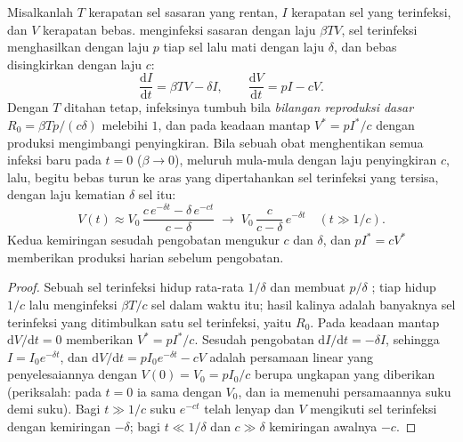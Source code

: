 \begin{theorem}\label{thm:b3:virology:dynamics}
%
Misalkanlah $T$ kerapatan sel sasaran yang rentan, $I$ kerapatan sel yang
terinfeksi, dan $V$ kerapatan  bebas.  menginfeksi sasaran dengan
laju $\beta TV$, sel terinfeksi menghasilkan  dengan laju $p$ tiap sel
lalu mati dengan laju $\delta$, dan  bebas disingkirkan dengan laju $c$:
\[
\frac{\mathrm{d}I}{\mathrm{d}t} = \beta TV - \delta I, \qquad
\frac{\mathrm{d}V}{\mathrm{d}t} = pI - cV .
\]
Dengan $T$ ditahan tetap, infeksinya tumbuh bila \emph{bilangan reproduksi
dasar} $R_{0} = \beta Tp/(c\delta)$ melebihi $1$, dan pada keadaan mantap
$V^{*} = p I^{*}/c$ dengan produksi mengimbangi penyingkiran.
Bila sebuah obat menghentikan semua infeksi baru pada $t = 0$ ($\beta \to 0$),
 meluruh mula-mula dengan laju penyingkiran $c$, lalu, begitu  bebas
turun ke aras yang dipertahankan sel terinfeksi yang tersisa, dengan laju
kematian $\delta$ sel itu:
\[
V(t) \approx V_{0}\,\frac{c\,e^{-\delta t} - \delta\,e^{-ct}}{c - \delta}
\;\longrightarrow\; V_{0}\,\frac{c}{c-\delta}\,e^{-\delta t}
\quad (t \gg 1/c).
\]
Kedua kemiringan  sesudah pengobatan mengukur $c$ dan
$\delta$, dan $pI^{*} = cV^{*}$ memberikan produksi  harian
sebelum pengobatan.
\end{theorem}
\begin{proof}
Sebuah sel terinfeksi hidup rata-rata $1/\delta$ dan membuat $p/\delta$
; tiap  hidup $1/c$ lalu menginfeksi $\beta T/c$ sel dalam waktu
itu; hasil kalinya adalah banyaknya sel terinfeksi yang ditimbulkan satu sel
terinfeksi, yaitu $R_{0}$. Pada keadaan mantap $\mathrm{d}V/\mathrm{d}t = 0$
memberikan $V^{*} = pI^{*}/c$. Sesudah pengobatan $\mathrm{d}I/\mathrm{d}t =
-\delta I$, sehingga $I = I_{0}e^{-\delta t}$, dan $\mathrm{d}V/\mathrm{d}t =
pI_{0}e^{-\delta t} - cV$ adalah persamaan linear yang penyelesaiannya dengan
$V(0) = V_{0} = pI_{0}/c$ berupa ungkapan yang diberikan (periksalah: pada
$t = 0$ ia sama dengan $V_{0}$, dan ia memenuhi persamaannya suku demi suku).
Bagi $t
\gg 1/c$ suku $e^{-ct}$ telah lenyap dan $V$ mengikuti sel terinfeksi
dengan kemiringan $-\delta$; bagi $t \ll 1/\delta$ dan $c \gg \delta$
kemiringan awalnya $-c$.
\end{proof}

